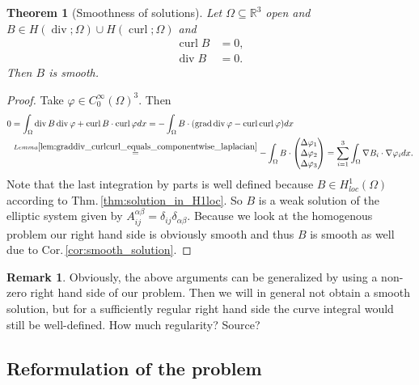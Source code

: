 \documentclass[12pt,a4paper]{article}
\numberwithin{equation}{subsection}
\numberwithin{lemma}{subsection}
\newtheorem{theorem}[lemma]{Theorem}
\theoremstyle{definition}
\newtheorem{remark}[lemma]{Remark}
\DeclareMathOperator{\curl}{curl}
\DeclareMathOperator{\diver}{div}
\DeclareMathOperator{\grad}{grad}
\newcommand{\real}{\mathbb{R}}
\begin{document}
\begin{theorem}[Smoothness of solutions]
    Let $\Omega \subseteq \real^3$ open and 
    $B \in H(\diver;\Omega) \cup H(\curl;\Omega)$ and 
    \begin{align*}
        \curl B &= 0,
        \\ \diver B &= 0.
    \end{align*}
    Then $B$ is smooth.
\end{theorem}
\begin{proof}
    Take $\varphi \in C_0^\infty(\Omega)^3$. Then 
    \begin{align*}
        0 &= \int_\Omega \diver B \diver \varphi + \curl B \cdot \curl \varphi dx
        = - \int_\Omega B \cdot (\grad \diver \varphi - \curl \curl \varphi) dx
        \\ &\stackrel{Lemma 
            \ref{lem:graddiv_curlcurl_equals_componentwise_laplacian}}{=} 
            - \int_\Omega B \cdot 
            \begin{pmatrix}
                \Delta \varphi_1 \\ \Delta \varphi_2 \\ \Delta \varphi_3
            \end{pmatrix}
        = \sum\limits_{i=1}^3 \int_\Omega \nabla B_i \cdot \nabla \varphi_i dx.
    \end{align*}
    Note that the last integration by parts is well defined because 
    $B \in H^1_{loc}(\Omega)$ according to Thm.\,\ref{thm:solution_in_H1loc}. 
    So $B$ is a weak solution 
    of the elliptic system given by 
    $A_{ij}^{\alpha \beta} = \delta_{ij} \delta_{\alpha\beta}$. Because 
    we look at the homogenous problem our right hand side is obviously smooth 
    and thus $B$ is smooth as well due to Cor.\,\ref{cor:smooth_solution}.
\end{proof}

\begin{remark}
    Obviously, the above arguments can be generalized by using a 
    non-zero right hand side of our problem. Then we will in general 
    not obtain a smooth solution, but for a sufficiently regular right hand 
    side the curve integral would still be well-defined.
    {\color{red} How much regularity? Source?}
\end{remark}


\subsection{Reformulation of the problem} 
\end{document}
